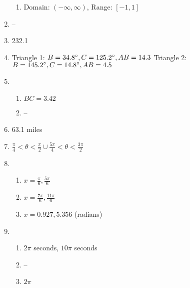 \documentclass{article}
\begin{document}
\begin{enumerate}
\begin{enumerate}
	\item Domain: $(-\infty, \infty)$, Range: $[-1,1]$
	
	\end{enumerate}
	
\item --

\item 232.1

\item Triangle 1: $B = 34.8\degree, C = 125.2\degree, AB = 14.3$ \newline
	Triangle 2: $B = 145.2\degree, C = 14.8\degree, AB = 4.5$
	
\item

	\begin{enumerate}
	
	\item $BC = 3.42$
	
	\item --
	
	\end{enumerate}
	
\item 63.1 miles

\item $\frac{\pi}{4} < \theta < \frac{\pi}{2} \cup \frac{5\pi}{4} < \theta < \frac{3\pi}{2}$

\item

	\begin{enumerate}
	
	\item $x = \frac{\pi}{6}, \frac{5\pi}{6}$
	
	\item $x = \frac{7\pi}{6}, \frac{11\pi}{6}$
	
	\item $x = 0.927, 5.356$ (radians)
	
	\end{enumerate}
	
\item

	\begin{enumerate}
	
	\item $2\pi$ seconds, $10\pi$ seconds
	
	\item --
	
	\item $2\pi$
	
	\end{enumerate}
	

\end{enumerate}
\end{document}

